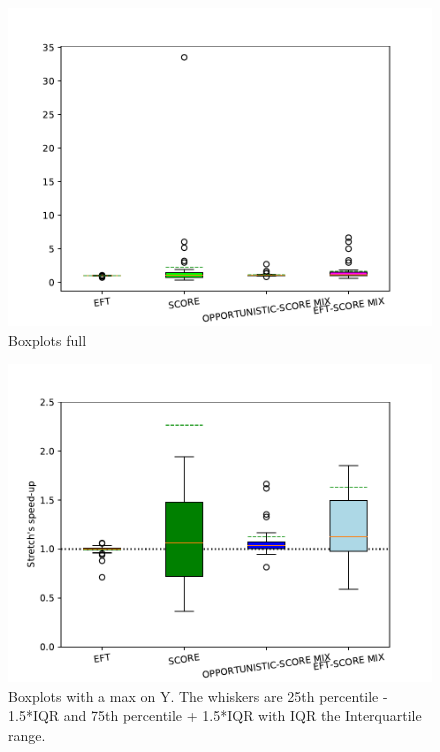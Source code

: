 \documentclass[conference,10pt]{IEEEtran}
\begin{document}
\begin{figure}\centering\includegraphics[width=1\linewidth]{../MBSS/plot/Boxplot/box_plot_mean_stretch_all_workloads_full.pdf}\caption{Boxplots full}\end{figure}
\begin{figure}\centering\includegraphics[width=1\linewidth]{../MBSS/plot/Boxplot/box_plot_mean_stretch_all_workloads.pdf}\caption{Boxplots with a max on Y. The whiskers are 25th percentile - 1.5*IQR and 75th percentile + 1.5*IQR with IQR the Interquartile range.}\end{figure}
\end{document}
